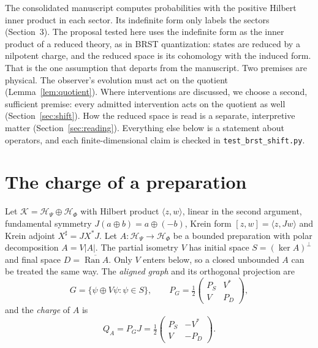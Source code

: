 \documentclass[11pt]{article}
\theoremstyle{remark}
\newcommand{\HP}{\mathcal H_\Psi}
\newcommand{\HF}{\mathcal H_\Phi}
\newcommand{\K}{\mathcal K}
\newcommand{\Ran}{\operatorname{Ran}}
\newcommand{\kr}[2]{[#1,#2]}
\begin{document}
The consolidated manuscript computes probabilities with the positive Hilbert inner product in each sector. Its indefinite form only labels the sectors (Section~3). The proposal tested here uses the indefinite form as the inner product of a reduced theory, as in BRST quantization: states are reduced by a nilpotent charge, and the reduced space is its cohomology with the induced form. That is the one assumption that departs from the manuscript. Two premises are physical. The observer's evolution must act on the quotient (Lemma~\ref{lem:quotient}). Where interventions are discussed, we choose a second, sufficient premise: every admitted intervention acts on the quotient as well (Section~\ref{sec:shift}). How the reduced space is read is a separate, interpretive matter (Section~\ref{sec:reading}). Everything else below is a statement about operators, and each finite-dimensional claim is checked in \texttt{test\_brst\_shift.py}.

\section{The charge of a preparation}

Let $\K=\HP\oplus\HF$ with Hilbert product $\langle z,w\rangle$, linear in the second argument, fundamental symmetry $J(a\oplus b)=a\oplus(-b)$, Krein form $\kr zw=\langle z,Jw\rangle$ and Krein adjoint $X^\sharp=JX^*J$. Let $A:\HP\to\HF$ be a bounded preparation with polar decomposition $A=V|A|$. The partial isometry $V$ has initial space $S=(\ker A)^\perp$ and final space $D=\overline{\Ran A}$. Only $V$ enters below, so a closed unbounded $A$ can be treated the same way. The \emph{aligned graph} and its orthogonal projection are
\begin{equation}
 G=\{\psi\oplus V\psi:\psi\in S\},\qquad
 P_G=\tfrac12\begin{pmatrix}P_S&V^*\\ V&P_D\end{pmatrix},
 \label{eq:graph-projection}
\end{equation}
and the \emph{charge} of $A$ is
\begin{equation}
 Q_A=P_GJ=\tfrac12\begin{pmatrix}P_S&-V^*\\ V&-P_D\end{pmatrix}.
 \label{eq:charge}
\end{equation}
\end{document}
